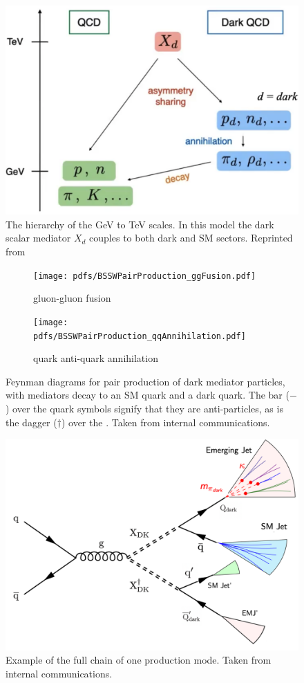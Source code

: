 \begin{figure}
	\centering
	\includegraphics[width=0.8\linewidth]{Images/DarkQCDModel.png}
	\caption[The hierarchy of the GeV to TeV scales.]{The hierarchy of the GeV to TeV scales. In this model the dark scalar mediator $X_d$ couples to both dark and SM sectors. Reprinted from \cite{Schwaller:2015gea}}
	\label{fig:dark-qcdmodel}
\end{figure}


\begin{figure}
	\begin{center}
		\begin{subfigure}{.45\linewidth}
			\texttt{[image: pdfs/BSSWPairProduction\_ggFusion.pdf]}
			\caption{gluon-gluon fusion}
		\end{subfigure}
		\begin{subfigure}{.45\linewidth}
			\texttt{[image: pdfs/BSSWPairProduction\_qqAnnihilation.pdf]}
			\caption{quark anti-quark annihilation}
		\end{subfigure}
	\end{center}
	\caption[Emergin jets production modes]{Feynman diagrams for pair production of dark mediator particles, with mediators decay to an SM quark and a dark quark. The bar ($-$) over the quark symbols signify that they are anti-particles, as is the dagger ($\dagger$) over the \Mdark. Taken from internal communications.}
	\label{fig:emj_production1}
\end{figure}

\begin{figure}
	\centering
	\includegraphics[width=.8\linewidth]{Images/EMJ_production.png}
	\caption{Example of the full chain of one production mode. Taken from internal communications.}
	\label{fig:full-chain}
\end{figure}


